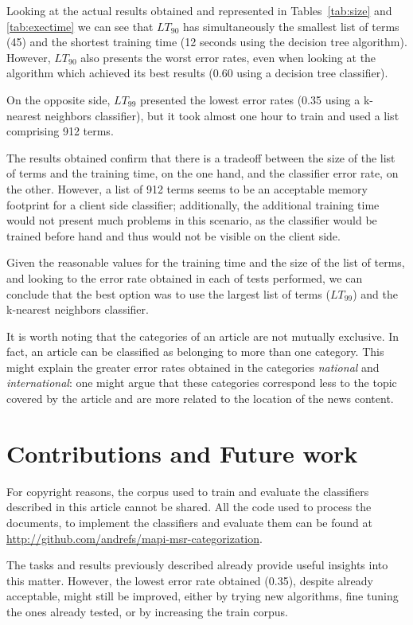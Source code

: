 \documentclass[conference]{IEEEtran}
\begin{document}
Looking at the actual results obtained and represented in
Tables~\ref{tab:size} and \ref{tab:exectime} we can see that $LT_{90}$
has simultaneously the smallest list of terms (45) and the shortest
training time (12 seconds using the decision tree algorithm). However,
$LT_{90}$ also presents the worst error rates, even when looking at
the algorithm which achieved its best results (0.60 using a decision
tree classifier).

On the opposite side, $LT_{99}$ presented the lowest error rates (0.35
using a k-nearest neighbors classifier), but it took almost one hour
to train and used a list comprising 912 terms.

The results obtained confirm that there is a tradeoff between the size
of the list of terms and the training time, on the one hand, and the
classifier error rate, on the other. However, a list of 912 terms
seems to be an acceptable memory footprint for a client side
classifier; additionally, the additional training time would not present
much problems in this scenario, as the classifier would be trained
before hand and thus would not be visible on the client side.

Given the reasonable values for the training time and the size of the
list of terms, and looking to the error rate obtained in each of tests
performed, we can conclude that the best option was to use the largest
list of terms ($LT_{99}$) and the k-nearest neighbors classifier.

It is worth noting that the categories of an article are not mutually
exclusive. In fact, an article can be classified as belonging to more
than one category. This might explain the greater error rates obtained
in the categories \textit{national} and  \textit{international}: one
might argue that these categories correspond less to the topic covered
by the article and are more related to the location of the news
content.

\section{Contributions and Future work}
For copyright reasons, the corpus used to train and evaluate the
classifiers described in this article cannot be shared. All the code
used to process the documents, to implement the classifiers and
evaluate them can be found at\\
\url{http://github.com/andrefs/mapi-msr-categorization}.

The tasks and results previously described already provide useful
insights into this matter. However, the lowest error rate obtained
(0.35), despite already acceptable, might still be improved, either by
trying new algorithms, fine tuning the ones already tested, or by
increasing the train corpus.
\end{document}
